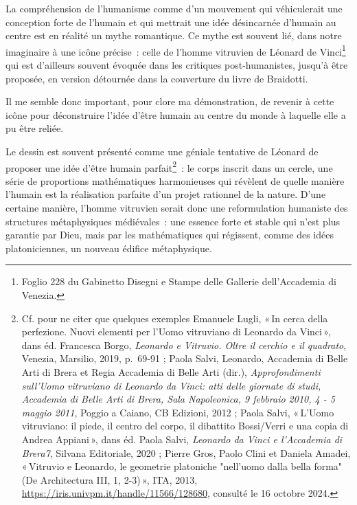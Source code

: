 La compréhension de l'humanisme comme d'un mouvement qui véhiculerait
une conception forte de l'humain et qui mettrait une idée désincarnée
d'humain au centre est en réalité un mythe romantique. Ce mythe est
souvent lié, dans notre imaginaire à une icône précise~: celle de
l'homme vitruvien de Léonard de Vinci\footnote{Foglio 228 du Gabinetto
  Disegni e Stampe delle Gallerie dell'Accademia di Venezia.} qui est
d'ailleurs souvent évoquée dans les critiques post-humanistes, jusqu'à
être proposée, en version détournée dans la couverture du livre de
Braidotti.

Il me semble donc important, pour clore ma démonstration, de revenir à
cette icône pour déconstruire l'idée d'être humain au centre du monde à
laquelle elle a pu être reliée.

Le dessin est souvent présenté comme une géniale tentative de Léonard de
proposer une idée d'être humain parfait\footnote{Cf. pour ne citer que
  quelques exemples Emanuele Lugli, {«\,In cerca della perfezione.
  {Nuovi} elementi per l'{Uomo} vitruviano di {Leonardo} da {Vinci}\,»},
  dans éd. Francesca Borgo, \emph{Leonardo e {Vitruvio}. {Oltre} il
  cerchio e il quadrato}, Venezia, Marsilio, 2019, p.~69‑91 ; Paola
  Salvi, Leonardo, Accademia di Belle Arti di Brera et Regia Accademia
  di Belle Arti (dir.), \emph{Approfondimenti sull'{Uomo} vitruviano di
  {Leonardo} da {Vinci}: atti delle giornate di studi, {Accademia} di
  {Belle} {Arti} di {Brera}, {Sala} {Napoleonica}, 9 febbraio 2010, 4 -
  5 maggio 2011}, Poggio a Caiano, CB Edizioni, 2012 ; Paola Salvi,
  {«\,L'{Uomo} vitruviano: il piede, il centro del corpo, il dibattito
  {Bossi}/{Verri} e una copia di {Andrea} {Appiani}\,»}, dans éd. Paola
  Salvi, \emph{Leonardo da {Vinci} e l'{Accademia} di {Brera7}}, Silvana
  Editoriale, 2020 ; Pierre Gros, Paolo Clini et Daniela Amadei,
  {«\,Vitruvio e {Leonardo}, le geometrie platoniche "nell'uomo dalla
  bella forma" ({De} {Architectura} {III}, 1, 2-3)\,»}, ITA, 2013,
  \url{https://iris.univpm.it/handle/11566/128680}, consulté le 16
  octobre 2024.}~: le corps inscrit dans un cercle, une série de
proportions mathématiques harmonieuses qui révèlent de quelle manière
l'humain est la réalisation parfaite d'un projet rationnel de la nature.
D'une certaine manière, l'homme vitruvien serait donc une reformulation
humaniste des structures métaphysiques médiévales~: une essence forte et
stable qui n'est plus garantie par Dieu, mais par les mathématiques qui
régissent, comme des idées platoniciennes, un nouveau édifice
métaphysique.

